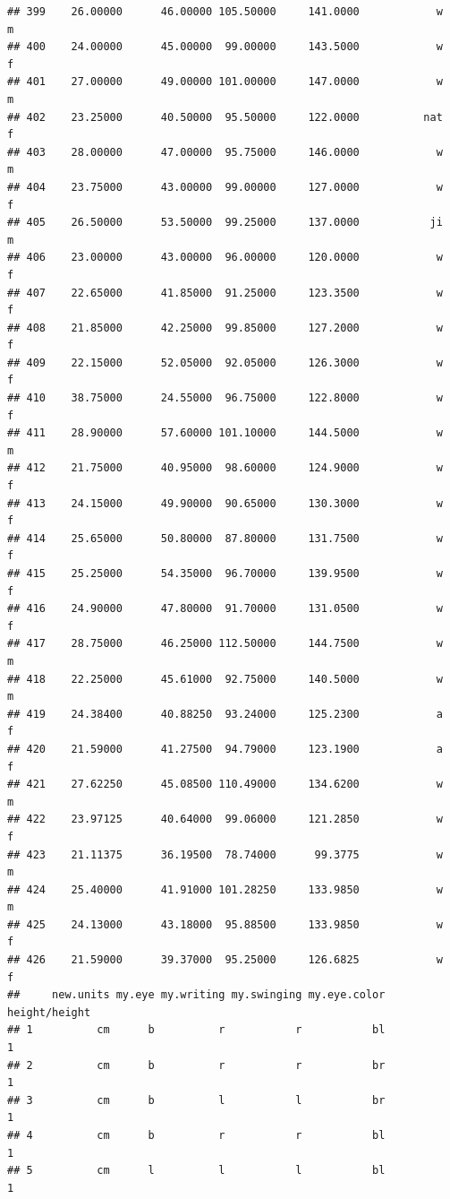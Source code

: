 \documentclass[]{article}
\begin{document}
\begin{verbatim}
## 399    26.00000      46.00000 105.50000     141.0000            w         m
## 400    24.00000      45.00000  99.00000     143.5000            w         f
## 401    27.00000      49.00000 101.00000     147.0000            w         m
## 402    23.25000      40.50000  95.50000     122.0000          nat         f
## 403    28.00000      47.00000  95.75000     146.0000            w         m
## 404    23.75000      43.00000  99.00000     127.0000            w         f
## 405    26.50000      53.50000  99.25000     137.0000           ji         m
## 406    23.00000      43.00000  96.00000     120.0000            w         f
## 407    22.65000      41.85000  91.25000     123.3500            w         f
## 408    21.85000      42.25000  99.85000     127.2000            w         f
## 409    22.15000      52.05000  92.05000     126.3000            w         f
## 410    38.75000      24.55000  96.75000     122.8000            w         f
## 411    28.90000      57.60000 101.10000     144.5000            w         m
## 412    21.75000      40.95000  98.60000     124.9000            w         f
## 413    24.15000      49.90000  90.65000     130.3000            w         f
## 414    25.65000      50.80000  87.80000     131.7500            w         f
## 415    25.25000      54.35000  96.70000     139.9500            w         f
## 416    24.90000      47.80000  91.70000     131.0500            w         f
## 417    28.75000      46.25000 112.50000     144.7500            w         m
## 418    22.25000      45.61000  92.75000     140.5000            w         m
## 419    24.38400      40.88250  93.24000     125.2300            a         f
## 420    21.59000      41.27500  94.79000     123.1900            a         f
## 421    27.62250      45.08500 110.49000     134.6200            w         m
## 422    23.97125      40.64000  99.06000     121.2850            w         f
## 423    21.11375      36.19500  78.74000      99.3775            w         m
## 424    25.40000      41.91000 101.28250     133.9850            w         m
## 425    24.13000      43.18000  95.88500     133.9850            w         f
## 426    21.59000      39.37000  95.25000     126.6825            w         f
##     new.units my.eye my.writing my.swinging my.eye.color height/height
## 1          cm      b          r           r           bl             1
## 2          cm      b          r           r           br             1
## 3          cm      b          l           l           br             1
## 4          cm      b          r           r           bl             1
## 5          cm      l          l           l           bl             1

\end{verbatim}
\end{document}
